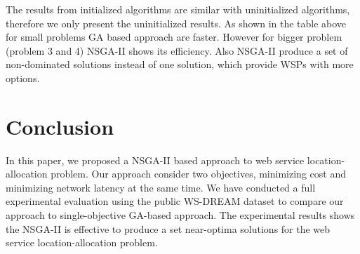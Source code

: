 \documentclass{llncs}
\begin{document}
The results from initialized algorithms are similar with uninitialized algorithms, therefore we only present the uninitialized results.
As shown in the table above for small problems GA based approach are faster. However for bigger problem (problem 3 and 4) NSGA-II shows its efficiency. Also NSGA-II produce a set of 
non-dominated solutions instead of one solution, which provide WSPs with more options.
%



\section{Conclusion}
\label{sec:conclusion}
In this paper, we proposed a NSGA-II based approach to web service location-allocation problem. 
Our approach consider two objectives, minimizing cost  and minimizing network latency at the same time.
We have conducted a full experimental evaluation using the public WS-DREAM dataset to compare our approach to single-objective GA-based approach.
The experimental results shows the NSGA-II is effective to produce a set near-optima solutions for the web service location-allocation problem.




\end{document}
